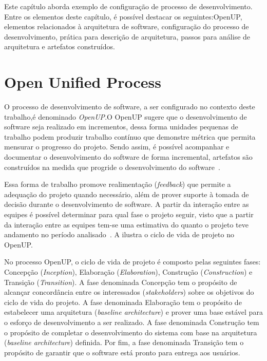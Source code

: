 Este capítulo aborda exemplo de configuração de processo de desenvolvimento. Entre os elementos deste capítulo, é possível destacar os seguintes:\acrfull{OpenUP}, elementos relacionados à arquitetura de software, configuração do processo de desenvolvimento, prática para descrição de arquitetura, passos para análise de arquitetura e artefatos construídos.

\section{Open Unified Process}

O processo de desenvolvimento de software, a ser configurado no contexto deste trabalho,é denominado \emph{\acrfull{OpenUP}}.O OpenUP sugere que o desenvolvimento de software seja realizado em incrementos, dessa forma unidades pequenas de trabalho podem produzir trabalho contínuo que demonstre métrica que permita mensurar o progresso do projeto. Sendo assim, é possível acompanhar e documentar o desenvolvimento do software de forma incremental, artefatos são construídos na medida que progride o desenvolvimento do software~\cite{openup}. 

Essa forma de trabalho promove realimentação (\emph{feedback}) que permite a adequação do projeto quando necessário, além de prover suporte à tomada de decisão durante o desenvolvimento de software. A partir da interação entre as equipes é possível determinar para qual fase o projeto seguir, visto que a partir da interação entre as equipes tem-se uma estimativa do quanto o projeto teve andamento no período analisado~\cite{openup}. A  ilustra o ciclo de vida de projeto no OpenUP.

%

No processo OpenUP, o ciclo de vida de projeto é composto pelas seguintes fases: Concepção (\emph{Inception}), Elaboração (\emph{Elaboration}), Construção (\emph{Construction}) e Transição (\emph{Transition}). A fase denominada  Concepção tem o propósito de alcançar concordância entre os interessados (\emph{stakeholders}) sobre os objetivos do ciclo de vida do projeto. A fase denominada Elaboração tem o propósito de estabelecer uma arquitetura (\emph{baseline architecture}) e prover uma base estável para o esforço de desenvolvimento a ser realizado. A fase denominada Construção tem o propósito de completar o desenvolvimento do sistema com base na arquitetura (\emph{baseline architecture}) definida. Por fim, a fase denominada Transição tem o propósito de garantir que o software está pronto para entrega aos usuários.

